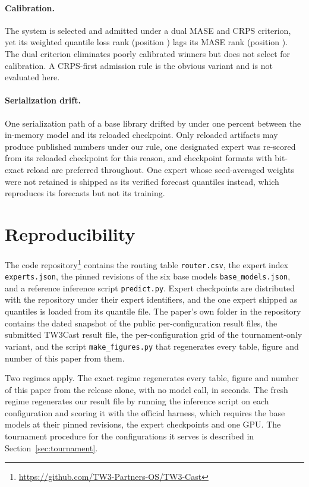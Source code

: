 \documentclass[11pt]{article}
\newcommand{\code}[1]{\texttt{#1}}
\begin{document}
\paragraph{Calibration.} The system is selected and admitted under a
dual MASE and CRPS criterion, yet its weighted quantile loss rank
(position \ourWqlPos) lags its MASE rank (position \ourPos). The dual criterion eliminates poorly calibrated winners but does not
select for calibration. A CRPS-first admission rule is the obvious
variant and is not evaluated here.

\paragraph{Serialization drift.} One serialization path of a base library
drifted by under one percent between the in-memory model and its reloaded
checkpoint. Only reloaded artifacts may produce published numbers under
our rule, one designated expert was re-scored from its reloaded checkpoint
for this reason, and checkpoint formats with bit-exact reload are
preferred throughout. One expert whose seed-averaged weights were not
retained is shipped as its verified forecast quantiles instead, which
reproduces its forecasts but not its training.

\section{Reproducibility}
\label{sec:repro}

The code repository\footnote{\url{https://github.com/TW3-Partners-OS/TW3-Cast}}
contains the routing table \code{router.csv}, the expert index
\code{experts.json}, the pinned revisions of the six base models
\code{base\_models.json}, and a reference inference script
\code{predict.py}. Expert checkpoints are distributed with the repository under their expert
identifiers, and the one expert shipped as quantiles is loaded from its
quantile file.
The paper's own folder in the repository contains the dated snapshot
of the public per-configuration result files, the submitted TW3Cast
result file, the per-configuration grid of the tournament-only variant,
and the script \code{make\_figures.py} that regenerates every table,
figure and number of this paper from them.

Two regimes apply. The exact regime regenerates every table, figure and
number of this paper from the release alone, with no model call, in
seconds. The fresh regime regenerates our result file by running the inference
script on each configuration and scoring it with the official harness,
which requires the base models at their pinned revisions, the expert
checkpoints and one GPU. The tournament procedure for the \nTournament{} configurations it serves
is described in Section~\ref{sec:tournament}.
\end{document}
